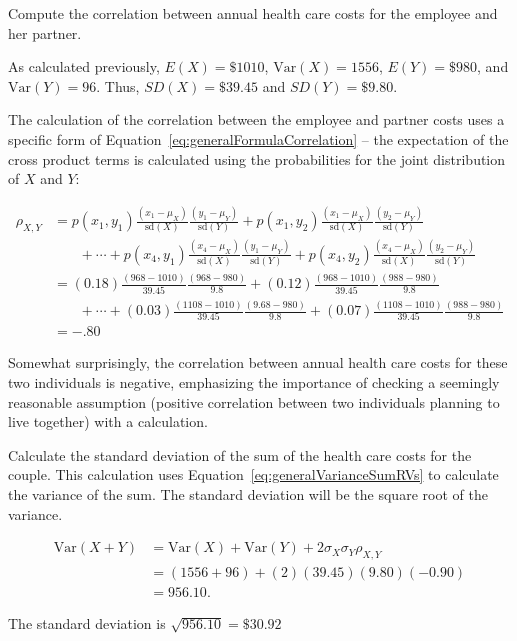 

\begin{example}{Compute the correlation between annual health care costs for the employee and her partner.} 

As calculated previously, $E(X) = \$1010$, $\textrm{Var}(X) = 1556$, $E(Y) = \$980$, and $\textrm{Var}(Y)= 96$. Thus, $SD(X) = \$39.45$ and $SD(Y) = \$9.80$.
	
The calculation of the correlation between the employee and partner costs uses a specific form of Equation~\ref{eq:generalFormulaCorrelation} -- the expectation of the cross product terms is calculated using the probabilities for the joint distribution of $X$ and $Y$:

\begin{align*}
	\rho_{X,Y} &= p(x_1,y_1) \frac{(x_1 - \mu_X)}{\textrm{sd}(X)}\frac{(y_1 - \mu_Y)}{\textrm{sd}(Y)} 
           + p(x_1,y_2)\frac{(x_1 - \mu_X)}{\textrm{sd}(X)}\frac{(y_2 - \mu_Y)}{\textrm{sd}(Y)}  \\
		    &\phantom{{}=1} + \cdots + p(x_4,y_1)\frac{(x_4 - \mu_X)}{\textrm{sd}(X)}\frac{(y_1 - \mu_Y)}{\textrm{sd}(Y)} + p(x_4,y_2)\frac{(x_4 - \mu_X)}{\textrm{sd}(X)}\frac{(y_2 - \mu_Y)}{\textrm{sd}(Y)} \\
	&= (0.18) \frac{(968 - 1010)}{39.45}\frac{(968 - 980)}{9.8} 
           + (0.12)\frac{(968 - 1010)}{39.45}\frac{(988 - 980)}{9.8}  \\
		    &\phantom{{}=1} + \cdots + (0.03)\frac{(1108 - 1010)}{39.45}\frac{(9.68 - 980)}{9.8} + (0.07)\frac{(1108 - 1010)}{39.45}\frac{(988 - 980)}{9.8} \\
	&= -.80
\end{align*} 

Somewhat surprisingly, the correlation between annual health care costs for these two individuals is negative, emphasizing the importance of checking a seemingly reasonable assumption (positive correlation between two individuals planning to live together) with a calculation.
\end{example}


\begin{example}{Calculate the standard deviation of the sum of the health care costs for the couple.}
This calculation uses Equation~\ref{eq:generalVarianceSumRVs} to calculate the variance of the sum.  The standard deviation will be the square root of the variance.

\begin{align*} 
	\text{Var}(X + Y) &= \text{Var}(X) + \text{Var}(Y) + 
	2 \sigma_X \sigma_Y \rho_{X,Y} \\
	&= (1556 + 96) + (2)(39.45)(9.80)(-0.90) \\
	& = 956.10.
\end{align*}

The standard deviation is $\sqrt{956.10} = \$30.92$



\end{example}


